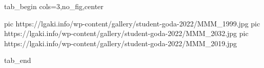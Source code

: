  
 
 
 
 


\ifcmt
  tab_begin cols=3,no_fig,center

     pic https://lgaki.info/wp-content/gallery/student-goda-2022/MMM_1999.jpg
		 pic https://lgaki.info/wp-content/gallery/student-goda-2022/MMM_2032.jpg
		 pic https://lgaki.info/wp-content/gallery/student-goda-2022/MMM_2019.jpg

  tab_end
\fi
